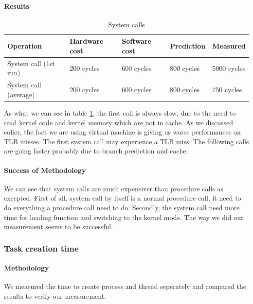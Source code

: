 \paragraph{Results}
\begin{table} [h]
\begin{center}
\begin{tabular}{| l | l | l | l | l |}
\hline
Operation 				& Hardware cost & Software cost & Prediction & Measured \\ \hline
System call (1st run) & 200 cycles & 600 cycles & 800 cycles & 5000 cycles\\ \hline
System call (average) & 200 cycles & 600 cycles & 800 cycles & 750 cycles\\ \hline
\end{tabular}
\end{center}

\caption{System calls\label {tab:sysCall}}
\end{table}


As what we can see in table \ref{tab:sysCall}, the first call is always slow,
due to the need to read kernel code and kernel memory which are not in cache.
As we discussed ealier, the fact we are using virtual machine is giving us worse
performances on TLB misses.
The first system call may experience a TLB miss.
The following calls are going faster probably due to branch prediction and
cache.

\paragraph{Success of Methodology}
We can see that system calls are much expensiver than procedure calls as excepted.
First of all, system call by itself is a normal procedure call, it need to do everything a procedure call need to do.
Secondly, the system call need more time for loading function and switching to the kernel mode.
The way we did our measurement seems to be successful.



\subsubsection{Task creation time}
\paragraph{Methodology}
We measured the time to create process and thread seperately and
compared the results to verify our measurement.

